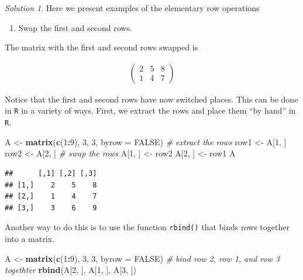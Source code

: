 \documentclass[
]{book}
\newenvironment{Shaded}{\begin{snugshade}}{\end{snugshade}}
\newcommand{\CommentTok}[1]{\textcolor[rgb]{0.56,0.35,0.01}{\textit{#1}}}
\newcommand{\DataTypeTok}[1]{\textcolor[rgb]{0.13,0.29,0.53}{#1}}
\newcommand{\DecValTok}[1]{\textcolor[rgb]{0.00,0.00,0.81}{#1}}
\newcommand{\KeywordTok}[1]{\textcolor[rgb]{0.13,0.29,0.53}{\textbf{#1}}}
\newcommand{\NormalTok}[1]{#1}
\newcommand{\OperatorTok}[1]{\textcolor[rgb]{0.81,0.36,0.00}{\textbf{#1}}}
\newcommand{\OtherTok}[1]{\textcolor[rgb]{0.56,0.35,0.01}{#1}}
\newcommand{\StringTok}[1]{\textcolor[rgb]{0.31,0.60,0.02}{#1}}
\providecommand{\tightlist}{%
  \setlength{\itemsep}{0pt}\setlength{\parskip}{0pt}}
\theoremstyle{definition}
\theoremstyle{definition}
\theoremstyle{definition}
\theoremstyle{remark}
\newtheorem*{solution}{Solution}
\begin{document}
\begin{solution}

Here we present examples of the elementary row operations

\begin{enumerate}
\def\labelenumi{\arabic{enumi})}
\tightlist
\item
  Swap the first and second rows.
\end{enumerate}

The matrix with the first and second rows swapped is

\[
\begin{aligned}
\begin{pmatrix} 2 & 5 & 8 \\ 1 & 4 & 7 \end{pmatrix}
\end{aligned}
\]

Notice that the first and second rows have now switched places. This can be done in \texttt{R} in a variety of ways. First, we extract the rows and place them ``by hand'' in \texttt{R}.

\begin{Shaded}
\begin{Highlighting}[]
\NormalTok{A <-}\StringTok{ }\KeywordTok{matrix}\NormalTok{(}\KeywordTok{c}\NormalTok{(}\DecValTok{1}\OperatorTok{:}\DecValTok{9}\NormalTok{), }\DecValTok{3}\NormalTok{, }\DecValTok{3}\NormalTok{, }\DataTypeTok{byrow =} \OtherTok{FALSE}\NormalTok{)}
\CommentTok{# extract the rows}
\NormalTok{row1 <-}\StringTok{ }\NormalTok{A[}\DecValTok{1}\NormalTok{, ] }
\NormalTok{row2 <-}\StringTok{ }\NormalTok{A[}\DecValTok{2}\NormalTok{, ]}
\CommentTok{# swap the rows}
\NormalTok{A[}\DecValTok{1}\NormalTok{, ] <-}\StringTok{ }\NormalTok{row2}
\NormalTok{A[}\DecValTok{2}\NormalTok{, ] <-}\StringTok{ }\NormalTok{row1}
\NormalTok{A}
\end{Highlighting}
\end{Shaded}

\begin{verbatim}
##      [,1] [,2] [,3]
## [1,]    2    5    8
## [2,]    1    4    7
## [3,]    3    6    9
\end{verbatim}

Another way to do this is to use the function \texttt{rbind()} that binds rows together into a matrix.

\begin{Shaded}
\begin{Highlighting}[]
\NormalTok{A <-}\StringTok{ }\KeywordTok{matrix}\NormalTok{(}\KeywordTok{c}\NormalTok{(}\DecValTok{1}\OperatorTok{:}\DecValTok{9}\NormalTok{), }\DecValTok{3}\NormalTok{, }\DecValTok{3}\NormalTok{, }\DataTypeTok{byrow =} \OtherTok{FALSE}\NormalTok{)}
\CommentTok{# bind row 2, row 1, and row 3 togethter}
\KeywordTok{rbind}\NormalTok{(A[}\DecValTok{2}\NormalTok{, ], A[}\DecValTok{1}\NormalTok{, ], A[}\DecValTok{3}\NormalTok{, ])}
\end{Highlighting}
\end{Shaded}


\end{solution}
\end{document}
